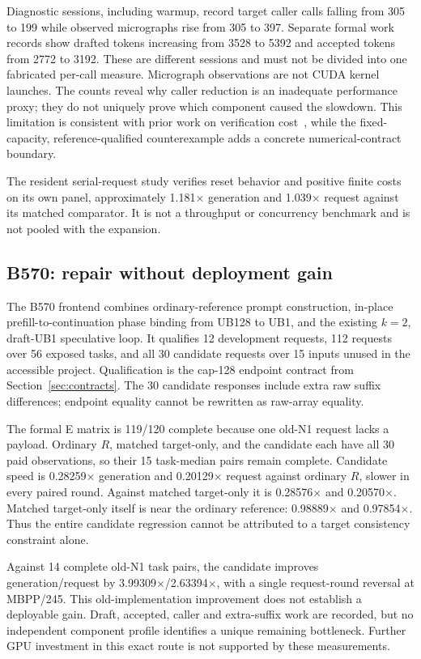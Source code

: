 \documentclass{article}
\begin{document}
Diagnostic sessions, including warmup, record target caller calls falling from 305 to 199 while observed micrographs rise from 305 to 397. Separate formal work records show drafted tokens increasing from 3528 to 5392 and accepted tokens from 2772 to 3192. These are different sessions and must not be divided into one fabricated per-call measure. Micrograph observations are not CUDA kernel launches. The counts reveal why caller reduction is an inadequate performance proxy; they do not uniquely prove which component caused the slowdown. This limitation is consistent with prior work on verification cost~\cite{illusion}, while the fixed-capacity, reference-qualified counterexample adds a concrete numerical-contract boundary.

The resident serial-request study verifies reset behavior and positive finite costs on its own panel, approximately 1.181$\times$ generation and 1.039$\times$ request against its matched comparator. It is not a throughput or concurrency benchmark and is not pooled with the expansion.

\subsection{B570: repair without deployment gain}
The B570 frontend combines ordinary-reference prompt construction, in-place prefill-to-continuation phase binding from UB128 to UB1, and the existing $k=2$, draft-UB1 speculative loop. It qualifies 12 development requests, 112 requests over 56 exposed tasks, and all 30 candidate requests over 15 inputs unused in the accessible project. Qualification is the cap-128 endpoint contract from Section~\ref{sec:contracts}. The 30 candidate responses include extra raw suffix differences; endpoint equality cannot be rewritten as raw-array equality.

The formal E matrix is 119/120 complete because one old-N1 request lacks a payload. Ordinary $R$, matched target-only, and the candidate each have all 30 paid observations, so their 15 task-median pairs remain complete. Candidate speed is 0.28259$\times$ generation and 0.20129$\times$ request against ordinary $R$, slower in every paired round. Against matched target-only it is 0.28576$\times$ and 0.20570$\times$. Matched target-only itself is near the ordinary reference: 0.98889$\times$ and 0.97854$\times$. Thus the entire candidate regression cannot be attributed to a target consistency constraint alone.

Against 14 complete old-N1 task pairs, the candidate improves generation/request by 3.99309$\times$/2.63394$\times$, with a single request-round reversal at MBPP/245. This old-implementation improvement does not establish a deployable gain. Draft, accepted, caller and extra-suffix work are recorded, but no independent component profile identifies a unique remaining bottleneck. Further GPU investment in this exact route is not supported by these measurements.
\end{document}
